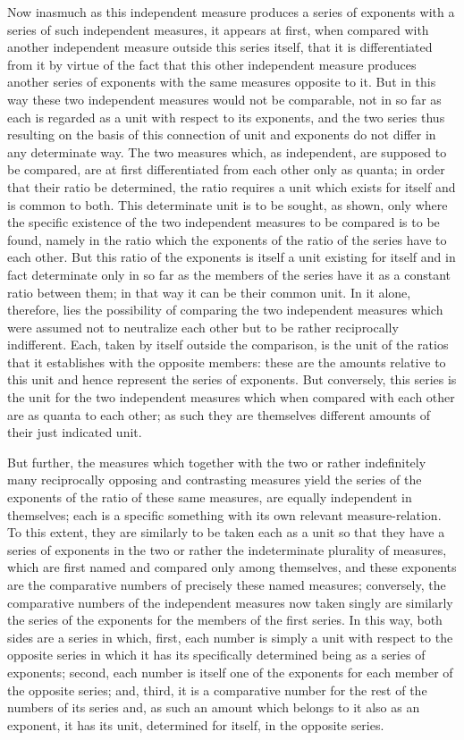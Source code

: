 Now inasmuch as this independent measure produces
a series of exponents with a series of such independent measures,
it appears at first, when compared with another
independent measure outside this series itself,
that it is differentiated from it by virtue of
the fact that this other independent measure produces
another series of exponents with the same measures opposite to it.
But in this way these two independent measures
would not be comparable,
not in so far as each is regarded as a unit
with respect to its exponents,
and the two series thus resulting on the basis
of this connection of unit and exponents
do not differ in any determinate way.
The two measures which, as independent,
are supposed to be compared,
are at first differentiated from each other only as quanta;
in order that their ratio be determined,
the ratio requires a unit which exists for itself
and is common to both.
This determinate unit is to be sought, as shown,
only where the specific existence of
the two independent measures to be compared
is to be found, namely in the ratio
which the exponents of the ratio of
the series have to each other.
But this ratio of the exponents is
itself a unit existing for itself
and in fact determinate only in so far as the members of
the series have it as a constant ratio between them;
in that way it can be their common unit.
In it alone, therefore, lies the possibility of comparing
the two independent measures which were assumed not
to neutralize each other but to be rather reciprocally indifferent.
Each, taken by itself outside the comparison,
is the unit of the ratios that it establishes
with the opposite members:
these are the amounts relative to this unit
and hence represent the series of exponents.
But conversely, this series is the unit
for the two independent measures which
when compared with each other are as quanta to each other;
as such they are themselves different amounts
of their just indicated unit.

But further, the measures which together with the two
or rather indefinitely many reciprocally opposing
and contrasting measures
yield the series of the exponents of
the ratio of these same measures,
are equally independent in themselves;
each is a specific something with its own relevant measure-relation.
To this extent, they are similarly to be taken each as a
unit so that they have a series of exponents in
the two or rather the indeterminate plurality of measures,
which are first named and compared only among themselves,
and these exponents are the comparative numbers of
precisely these named measures;
conversely, the comparative numbers of the independent measures
now taken singly are similarly the series of the
exponents for the members of the first series.
In this way, both sides are a series in which,
first, each number is simply a unit with respect to the
opposite series in which it has its specifically
determined being as a series of exponents;
second, each number is itself one of the exponents
for each member of the opposite series;
and, third, it is a comparative number for
the rest of the numbers of its series
and, as such an amount which belongs
to it also as an exponent,
it has its unit, determined for itself,
in the opposite series.


